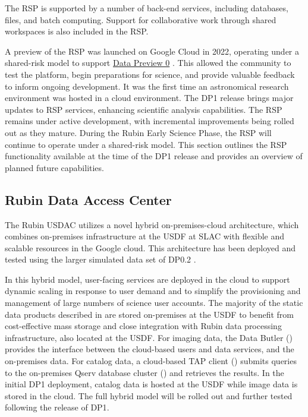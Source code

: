 The \gls{RSP} is supported by a number of back-end services, including databases, files, and batch computing.
Support for collaborative work through shared workspaces is also included in the \gls{RSP}.

A preview of the \gls{RSP} was launched on Google Cloud in 2022, operating under a shared-risk model to support \href{https://dp0.lsst.io/}{Data Preview 0} \citep{2024ASPC..535..227O}. This allowed the community to test the platform, begin preparations  for science, and provide valuable feedback to inform ongoing development.
It was the first time an astronomical research environment was hosted in a \gls{cloud} environment.
The DP1 release brings major updates to \gls{RSP} services, enhancing scientific analysis capabilities.
The \gls{RSP} remains under active development, with incremental improvements being rolled out as they mature.
During the Rubin Early Science Phase, the \gls{RSP} will continue to operate under a shared-risk model.
This section outlines the RSP functionality available at the time of the DP1 release and provides an overview of planned future capabilities.


\subsection{Rubin Data Access Center}
\label{ssec:usdac}
The Rubin USDAC utilizes a novel hybrid on-premises-\gls{cloud} architecture, which combines on-premises infrastructure at the \gls{USDF} at SLAC with flexible and scalable resources in the Google \gls{cloud}.
This architecture has been deployed and tested using the larger simulated data set of DP0.2 \citep{2024SPIE13101E..2BO}.

In this hybrid model, user-facing services are deployed in the \gls{cloud} to support
dynamic scaling in response to user demand and to simplify the provisioning and management of large numbers of science user accounts.
The majority of the static data products described in  are stored on-premises at the \gls{USDF} to benefit from cost-effective mass storage and close integration with Rubin data processing infrastructure, also located at the \gls{USDF}.
For imaging data, the Data Butler () provides the interface between the \gls{cloud}-based users and data services, and the on-premises data.
For catalog data, a \gls{cloud}-based \gls{TAP} client () submits queries to the on-premises \gls{Qserv} database cluster () and retrieves the results.
In the initial DP1 deployment, catalog data is hosted at the \gls{USDF} while image data is stored in the cloud.
The full hybrid model will be rolled out and further tested following the release of \gls{DP1}.

